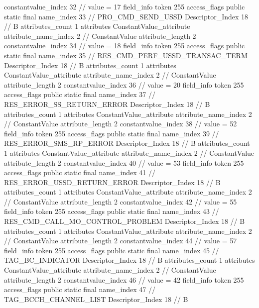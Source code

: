 {{{{{{{					constantvalue_index	32		// value = 17
				}
				}
			}
			field_info {
				token	255
				access_flags	public static final
				name_index	33		// PRO_CMD_SEND_USSD
				Descriptor_Index	18		// B
				attributes_count	1
				attributes {
				ConstantValue_attribute {
					attribute_name_index	2		// ConstantValue
					attribute_length	2
					constantvalue_index	34		// value = 18
				}
				}
			}
			field_info {
				token	255
				access_flags	public static final
				name_index	35		// RES_CMD_PERF_USSD_TRANSAC_TERM
				Descriptor_Index	18		// B
				attributes_count	1
				attributes {
				ConstantValue_attribute {
					attribute_name_index	2		// ConstantValue
					attribute_length	2
					constantvalue_index	36		// value = 20
				}
				}
			}
			field_info {
				token	255
				access_flags	public static final
				name_index	37		// RES_ERROR_SS_RETURN_ERROR
				Descriptor_Index	18		// B
				attributes_count	1
				attributes {
				ConstantValue_attribute {
					attribute_name_index	2		// ConstantValue
					attribute_length	2
					constantvalue_index	38		// value = 52
				}
				}
			}
			field_info {
				token	255
				access_flags	public static final
				name_index	39		// RES_ERROR_SMS_RP_ERROR
				Descriptor_Index	18		// B
				attributes_count	1
				attributes {
				ConstantValue_attribute {
					attribute_name_index	2		// ConstantValue
					attribute_length	2
					constantvalue_index	40		// value = 53
				}
				}
			}
			field_info {
				token	255
				access_flags	public static final
				name_index	41		// RES_ERROR_USSD_RETURN_ERROR
				Descriptor_Index	18		// B
				attributes_count	1
				attributes {
				ConstantValue_attribute {
					attribute_name_index	2		// ConstantValue
					attribute_length	2
					constantvalue_index	42		// value = 55
				}
				}
			}
			field_info {
				token	255
				access_flags	public static final
				name_index	43		// RES_CMD_CALL_MO_CONTROL_PROBLEM
				Descriptor_Index	18		// B
				attributes_count	1
				attributes {
				ConstantValue_attribute {
					attribute_name_index	2		// ConstantValue
					attribute_length	2
					constantvalue_index	44		// value = 57
				}
				}
			}
			field_info {
				token	255
				access_flags	public static final
				name_index	45		// TAG_BC_INDICATOR
				Descriptor_Index	18		// B
				attributes_count	1
				attributes {
				ConstantValue_attribute {
					attribute_name_index	2		// ConstantValue
					attribute_length	2
					constantvalue_index	46		// value = 42
				}
				}
			}
			field_info {
				token	255
				access_flags	public static final
				name_index	47		// TAG_BCCH_CHANNEL_LIST
				Descriptor_Index	18		// B
}}}}}
